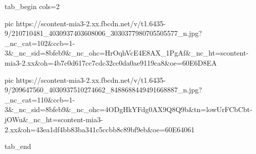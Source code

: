 \ifcmt
  tab_begin cols=2

     pic https://scontent-mia3-2.xx.fbcdn.net/v/t1.6435-9/210710481_4030937403608006_3030377980705505577_n.jpg?_nc_cat=102&ccb=1-3&_nc_sid=8bfeb9&_nc_ohc=HrOqhVcE4E8AX_1PgAf&_nc_ht=scontent-mia3-2.xx&oh=4b7c0d617cc7cdc32cc0da0ae9119ca8&oe=60E6D8EA

     pic https://scontent-mia3-2.xx.fbcdn.net/v/t1.6435-9/209647560_4030937510274662_8488688449491668887_n.jpg?_nc_cat=110&ccb=1-3&_nc_sid=8bfeb9&_nc_ohc=4ODgHkYFdg0AX9Q8Q9b&tn=lowUrFCbCbt-jOWu&_nc_ht=scontent-mia3-2.xx&oh=43ea1df4bb83ba341c5ccbb8c89bf9eb&oe=60E64061

  tab_end
\fi

